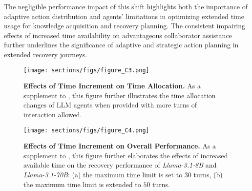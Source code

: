 The negligible performance impact of this shift highlights both the importance of adaptive action distribution and agents' limitations in optimizing extended time usage for knowledge acquisition and recovery planning. 
The consistent impairing effects of increased time availability on advantageous collaborator assistance further underlines the significance of adaptive and strategic action planning in extended recovery journeys.



\begin{figure}
\begin{center}
\begin{small}
    \texttt{[image: sections/figs/figure\_C3.png]}
    \caption{\textbf{Effects of Time Increment on Time Allocation.} As a supplement to , this figure further illustrates the time allocation changes of LLM agents when provided with more turns of interaction allowed.}
    \label{fig:figure C3 (time awareness - allocation)}
\end{small}
\end{center}
\end{figure}



\begin{figure}
\begin{center}
\begin{small}
    \texttt{[image: sections/figs/figure\_C4.png]}
    \caption{\textbf{Effects of Time Increment on Overall Performance.} As a supplement to , this figure further elaborates the effects of increased available time on the recovery performance of \textit{Llama-3.1-8B} and \textit{Llama-3.1-70B}: (a) the maximum time limit is set to $30$ turns, (b) the maximum time limit is extended to $50$ turns.}
    \label{fig:figure C4 (time awareness - performance)}
\end{small}
\end{center}
\end{figure}



